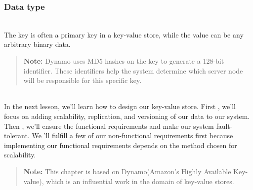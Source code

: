 \subsubsection{Data type}\label{wsn66H_rub8h6Nq3PHCLX}
\\
The key is often a primary key in a key-value store, while the value can be any arbitrary binary data.
\begin{quote}
\textbf{Note:} Dynamo uses MD5 hashes on the key to generate a 128-bit identifier. These identifiers help the system determine which server node will be responsible for this specific key.
\end{quote}
\\
In the next lesson, we'll learn how to design our key-value store. First , we'll focus on adding scalability, replication, and versioning of our data to our system. Then
, we'll ensure the functional requirements and make our system fault-tolerant. We 'll fulfill a few of our non-functional requirements first because implementing our functional requirements depends on the method chosen for scalability.
\begin{quote}
\textbf{Note:} This chapter is based on Dynamo(Amazon's Highly Available Key-value), which is an influential work in the domain of key-value stores.
\end{quote}

